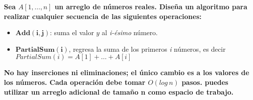 \textbf{Sea $A[1,\dots,n]$ un arreglo de números reales. Diseña un algoritmo
para realizar cualquier secuencia de las siguientes operaciones:}
\begin{itemize}
    \item $\mathbf{Add(i,j)}$: suma el valor $y$ al \textit{i-ésimo} número.
    \item $\mathbf{PartialSum(i)}$, regresa la suma de los primeros \textit{i} 
    números, es decir\\ $PartialSum(i)=A[1]+\dots+A[i]$
\end{itemize}
\textbf{No hay inserciones ni eliminaciones; el único cambio es a los valores de los
números. Cada operación debe tomar $O(log \, n)$ pasos. puedes utilizar un 
arreglo adicional de tamaño n como espacio de trabajo.}\\
